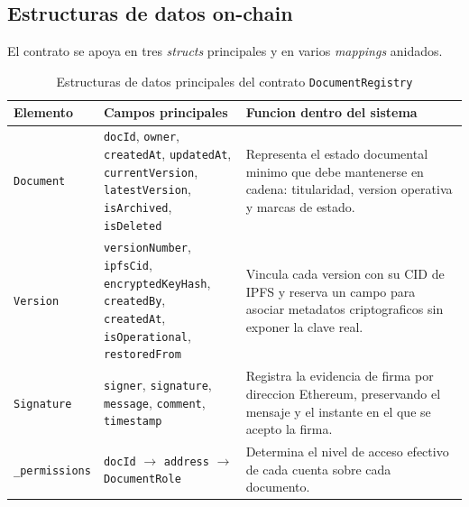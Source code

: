 \documentclass[11pt, a4paper]{article}
\begin{document}
\subsection{Estructuras de datos on-chain}

El contrato se apoya en tres \textit{structs} principales y en varios \textit{mappings} anidados.

\begin{table}[H]
    \centering
    \small
    \renewcommand{\arraystretch}{1.4}
    \begin{tabular}{@{}p{3.3cm}p{4.2cm}p{6.9cm}@{}}
    \toprule
    \textbf{Elemento} & \textbf{Campos principales} & \textbf{Funcion dentro del sistema} \\
    \midrule
    \texttt{Document} & \parbox[t]{4.1cm}{\texttt{docId}, \texttt{owner},\\ \texttt{createdAt}, \texttt{updatedAt},\\ \texttt{currentVersion}, \texttt{latestVersion},\\ \texttt{isArchived}, \texttt{isDeleted}} & Representa el estado documental minimo que debe mantenerse en cadena: titularidad, version operativa y marcas de estado. \\
    \addlinespace
    \texttt{Version} & \parbox[t]{4.1cm}{\texttt{versionNumber}, \texttt{ipfsCid},\\ \texttt{encryptedKeyHash}, \texttt{createdBy},\\ \texttt{createdAt}, \texttt{isOperational},\\ \texttt{restoredFrom}} & Vincula cada version con su CID de IPFS y reserva un campo para asociar metadatos criptograficos sin exponer la clave real. \\
    \addlinespace
    \texttt{Signature} & \parbox[t]{4.1cm}{\texttt{signer}, \texttt{signature},\\ \texttt{message}, \texttt{comment},\\ \texttt{timestamp}} & Registra la evidencia de firma por direccion Ethereum, preservando el mensaje y el instante en el que se acepto la firma. \\
    \addlinespace
    \texttt{\_permissions} & \parbox[t]{4.1cm}{\texttt{docId} $\rightarrow$ \texttt{address}\\ $\rightarrow$ \texttt{DocumentRole}} & Determina el nivel de acceso efectivo de cada cuenta sobre cada documento. \\
    \bottomrule
    \end{tabular}
    \caption{Estructuras de datos principales del contrato \texttt{DocumentRegistry}}
    \label{tab:estructuras-solidity}
\end{table}
\end{document}
